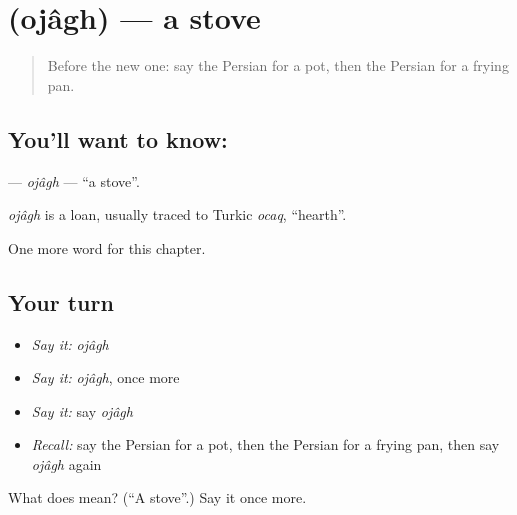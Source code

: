 \section[\texorpdfstring{\fa{اجاق} (ojâgh)}{اجاق (ojâgh)}]{ (ojâgh) — a stove}

\label{lesson:FA-C95-ojagh}



\begin{quote}
Before the new one: say the Persian for a pot, then the Persian for a frying pan.
\end{quote}

\subsection*{You'll want to know: }
\textbf{} — \emph{ojâgh} — \textquotedblleft{}a stove\textquotedblright{}.

\begin{cousinweb}
\emph{ojâgh} is a loan, usually traced to Turkic \emph{ocaq}, \textquotedblleft{}hearth\textquotedblright{}.
\end{cousinweb}

\begin{grammarlens}[title={What you've built}]
One more word for this chapter.
\end{grammarlens}

\subsection*{Your turn}
\begin{itemize}
\raggedright
  \item \emph{Say it:} \emph{ojâgh}
  \item \emph{Say it:} \emph{ojâgh}, once more
  \item \emph{Say it:} say \emph{ojâgh}
  \item \emph{Recall:} say the Persian for a pot, then the Persian for a frying pan, then say \emph{ojâgh} again
\end{itemize}

\begin{tcolorbox}[breakable,colback=teal!4,colframe=teal!35!black,title={Before you move on}]
What does  mean? (\textquotedblleft{}A stove\textquotedblright{}.) Say it once more.
\end{tcolorbox}
